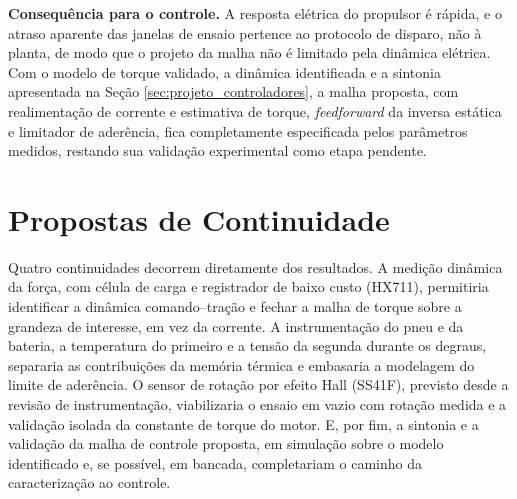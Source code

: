 \textbf{Consequência para o controle.} A resposta elétrica do propulsor é rápida, e o
atraso aparente das janelas de ensaio pertence ao protocolo de disparo, não à planta, de
modo que o projeto da malha não é limitado pela dinâmica elétrica. Com o modelo de torque
validado, a dinâmica identificada e a sintonia apresentada na Seção
\ref{sec:projeto_controladores}, a malha proposta, com realimentação de corrente e estimativa de
torque, \emph{feedforward} da inversa estática e limitador de aderência, fica completamente
especificada pelos parâmetros medidos, restando sua validação experimental como etapa
pendente.

\section{Propostas de Continuidade}

Quatro continuidades decorrem diretamente dos resultados. A medição dinâmica da força,
com célula de carga e registrador de baixo custo (HX711), permitiria identificar a dinâmica
comando--tração e fechar a malha de torque sobre a grandeza de interesse, em vez da corrente.
A instrumentação do pneu e da bateria, a temperatura do primeiro e a tensão da segunda durante
os degraus, separaria as contribuições da memória térmica e embasaria a modelagem do limite
de aderência. O sensor de rotação por efeito Hall (SS41F), previsto desde a revisão de
instrumentação, viabilizaria o ensaio em vazio com rotação medida e a validação isolada da
constante de torque do motor. E, por fim, a sintonia e a validação da malha de controle
proposta, em simulação sobre o modelo identificado e, se possível, em bancada, completariam o
caminho da caracterização ao controle.

\clearpage
